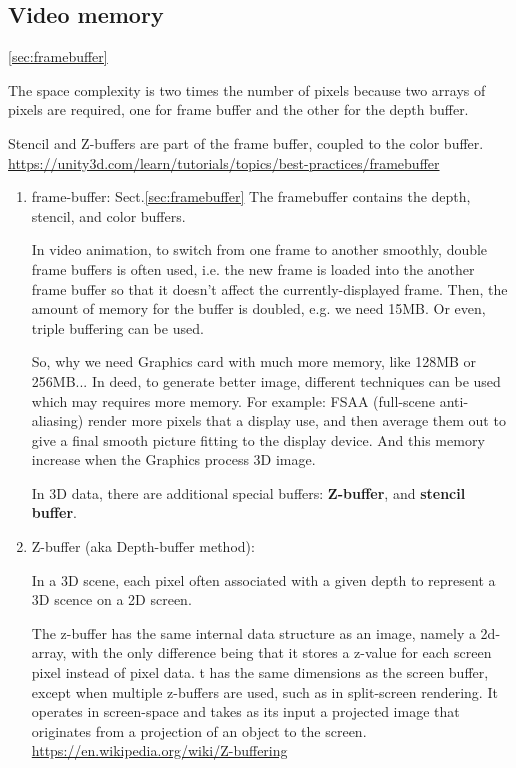 \subsection{Video memory}
\label{sec:video-memory}
\ref{sec:framebuffer}

The space complexity is two times the number of pixels because two arrays of
pixels are required, one for frame buffer and the other for the depth buffer.

Stencil and Z-buffers are part of the frame buffer, coupled to the color buffer. 
\url{https://unity3d.com/learn/tutorials/topics/best-practices/framebuffer}

\begin{enumerate}
  \item frame-buffer: Sect.\ref{sec:framebuffer}
  The framebuffer contains the depth, stencil, and color buffers.

In video animation, to switch from one frame to another smoothly,
double frame buffers is often used, i.e. the new frame is loaded into
the another frame buffer so that it doesn't affect the
currently-displayed frame. Then, the amount of memory for the buffer
is doubled, e.g. we need 15MB. Or even, triple buffering can be used.

So, why we need Graphics card with much more memory, like 128MB or
256MB... In deed, to generate better image, different techniques can
be used which may requires more memory. For example: FSAA (full-scene
anti-aliasing) render more pixels that a display use, and then average
them out to give a final smooth picture fitting to the display
device. And this memory increase when the Graphics process 3D image. 

In 3D data, there are additional special buffers: {\bf Z-buffer}, and
{\bf stencil buffer}. 
  
  \item Z-buffer (aka Depth-buffer method): \label{sec:z-buffer}

In a 3D scene, each pixel often associated with a given depth to represent a 3D scence on a 2D screen.


The z-buffer has the same internal data structure as an image, namely a
2d-array, with the only difference being that it stores a z-value for each
screen pixel instead of pixel data.
t has the same dimensions as the screen buffer, except when multiple z-buffers
are used, such as in split-screen rendering. It operates in screen-space and
takes as its input a projected image that originates from a projection of an
object to the screen. \url{https://en.wikipedia.org/wiki/Z-buffering}


\end{enumerate}
